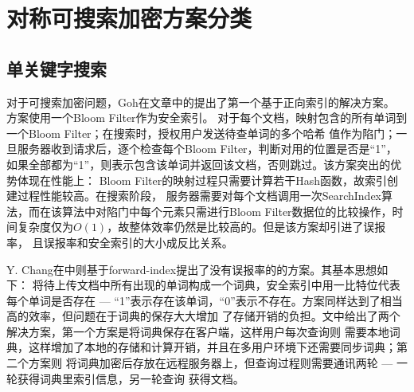 
\section{对称可搜索加密方案分类}
\label{sec:search_symm_symm}


\subsection{单关键字搜索}
\label{sec:search_symm_symm_exact}

对于可搜索加密问题，Goh在文章\cite{goh2003secure}中的提出了第一个基于正向索引的解决方案。
方案使用一个Bloom Filter\cite{gremillion1982designing}作为安全索引。
对于每个文档，映射包含的所有单词到一个Bloom Filter；在搜索时，授权用户发送待查单词的多个哈希
值作为陷门；一旦服务器收到请求后，逐个检查每个Bloom Filter，判断对用的位置是否是“1”，
如果全部都为“1”，则表示包含该单词并返回该文档，否则跳过。该方案突出的优势体现在性能上：
Bloom Filter的映射过程只需要计算若干Hash函数，故索引创建过程性能较高。在搜索阶段，
服务器需要对每个文档调用一次SearchIndex算法，而在该算法中对陷门中每个元素只需进行Bloom
Filter数据位的比较操作，时间复杂度仅为$O(1)$，故整体效率仍然是比较高的。但是该方案却引进了误报率，
且误报率和安全索引的大小成反比关系。

Y. Chang在\cite{chang2005privacy}中则基于forward-index提出了没有误报率的的方案。其基本思想如下：
将待上传文档中所有出现的单词构成一个词典，安全索引中用一比特位代表每个单词是否存在
--- “1”表示存在该单词，“0”表示不存在。方案同样达到了相当高的效率，但问题在于词典的保存大大增加
了存储开销的负担。文中给出了两个解决方案，第一个方案是将词典保存在客户端，这样用户每次查询则
需要本地词典，这样增加了本地的存储和计算开销，并且在多用户环境下还需要同步词典；第二个方案则
将词典加密后存放在远程服务器上，但查询过程则需要通讯两轮 --- 一轮获得词典里索引信息，另一轮查询
获得文档。

